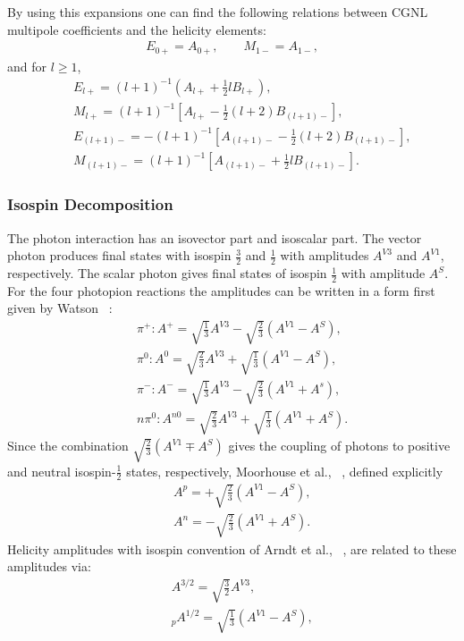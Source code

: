 %
By using this expansions one can find the following relations between CGNL multipole coefficients and the helicity elements:
%
\begin{align}
E_{0+} = A_{0+}, \qquad M_{1-} = A_{1-},\nonumber
\end{align}
and for $l\ge 1$,
\begin{align}
&&E_{l+} = (l+1)^{-1}(A_{l+} + \frac{1}{2}lB_{l+}),\\
&&M_{l+} = (l+1)^{-1}[A_{l+}-\frac{1}{2}(l+2)B_{(l+1)-}],\\
&&E_{(l+1)-} = -(l+1)^{-1}[A_{(l+1)-} - \frac{1}{2}(l+2)B_{(l+1)-}],\\
&&M_{(l+1)-} = (l+1)^{-1}[A_{(l+1)-} + \frac{1}{2}lB_{(l+1)-}].
\end{align}
%
\subsubsection{Isospin Decomposition}
%
The photon interaction has an isovector part and isoscalar part. The vector photon produces final states with isospin $\frac{3}{2}$ and $\frac{1}{2}$ with amplitudes $A^{V3}$ and $A^{V1}$, respectively. The scalar photon gives final states of isospin $\frac{1}{2}$ with amplitude $A^S$. For the four photopion reactions the amplitudes can be written in a form first given by Watson ~\protect\cite{Watson52}:
%
\begin{align}
&&\pi^+: A^+ = \sqrt{\frac{1}{3}}A^{V3} - \sqrt{\frac{2}{3}}(A^{V1} - A^{S}),\\
&&\pi^0: A^0 = \sqrt{\frac{2}{3}} A^{V3} + \sqrt{\frac{1}{3}}(A^{V1}-A^{S}),\\
&&\pi^{-}: A^- = \sqrt{\frac{1}{3}}A^{V3} - \sqrt{\frac{2}{3}}(A^{V1} + A^{s}),\\
&&n\pi^0: A^{n0} = \sqrt{\frac{2}{3}}A^{V3} + \sqrt{\frac{1}{3}}(A^{V1} + A^{S}).
\end{align} 
%
Since the combination $\sqrt{\frac{2}{3}}(A^{V1} \mp A^{S})$ gives the coupling of photons to positive and neutral isospin-$\frac{1}{2}$ states, respectively, Moorhouse  et al., ~\protect\cite{Rosenfeld}, defined explicitly
%
\begin{align}
&&A^p = + \sqrt{\frac{2}{3}}(A^{V1} - A^{S}),\\
&&A^n = -\sqrt{\frac{2}{3}}(A^{V1} + A^{S}).
\end{align}
%
Helicity amplitudes with isospin convention of Arndt et al., ~\protect\cite{ar90}, are related to these amplitudes via:
%
\begin{align}
&&A^{3/2} = \sqrt{\frac{3}{2}}A^{V3},\\
&&_pA^{1/2} = \sqrt{\frac{1}{3}}(A^{V1}-A^{S}),
\end{align}
